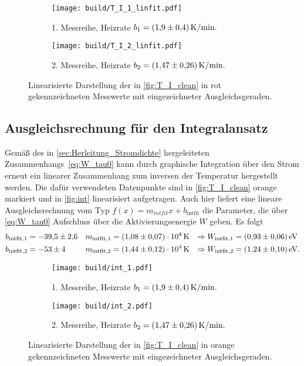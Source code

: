 \begin{figure}
    \centering
    \begin{subfigure}{\textwidth}
        \centering
        \texttt{[image: build/T\_I\_1\_linfit.pdf]}
        \caption{1. Messreihe, Heizrate $b_1 = \qty{1.9+-0.4}{\kelvin\per\minute}.$}
        \label{fig:T_I_1_Anstieg}
    \end{subfigure}
    \begin{subfigure}{\textwidth}
        \centering
        \texttt{[image: build/T\_I\_2\_linfit.pdf]}
        \caption{2. Messreihe, Heizrate $b_2 = \qty{1.47+-0.26}{\kelvin\per\minute}.$}
        \label{fig:T_I_2_Anstieg}
    \end{subfigure}
    \caption{Linearisierte Darstellung der in \autoref{fig:T_I_clean} in rot gekennzeichneten Messwerte mit eingezeichneter Ausgleichsgeraden.}
    \label{fig:T_I_Anstieg}
\end{figure}


\subsection{Ausgleichsrechnung für den Integralansatz}
\label{sec:Ausgleichsrechnung_Integralansatz}
Gemäß des in \autoref{sec:Herleitung_Stromdichte} hergeleiteten Zusammenhangs~\eqref{eq:W_tau0} kann durch graphische Integration über den Strom erneut ein linearer 
Zusammenhang zum inversen der Temperatur hergestellt werden. Die dafür verwendeten Datenpunkte sind in \autoref{fig:T_I_clean} orange markiert und in \autoref{fig:int}
linearisiert aufgetragen. Auch hier liefert eine lineare Ausgleichsrechnung vom Typ $f(x) = m_{intfit}x + b_{\text{intfit}}$ die Parameter, die über \autoref{eq:W_tau0} Aufschluss
über die Aktivierungsenergie $W$ geben. Es folgt
\begin{align*}
    b_{\text{intfit}, 1} &= \num{-39.5+-2.6} & m_{\text{intfit}, 1} &= \qty{1.08(0.07)e+04}{\kelvin} &\Rightarrow W_{\text{intfit}, 1} &= \qty{0.93+-0.06}{\electronvolt} \\
    b_{\text{intfit}, 2} &= \num{-53+-4}     & m_{\text{intfit}, 2} &= \qty{1.44(0.12)e+04}{\kelvin} &\Rightarrow W_{\text{intfit}, 2} &= \qty{1.24+-0.10}{\electronvolt}. \\
\end{align*}

\begin{figure}
    \centering
    \begin{subfigure}{\textwidth}
        \centering
        \texttt{[image: build/int\_1.pdf]}
        \caption{1. Messreihe, Heizrate $b_1 = \qty{1.9+-0.4}{\kelvin\per\minute}.$}
        \label{fig:int_1}
    \end{subfigure}
    \begin{subfigure}{\textwidth}
        \centering
        \texttt{[image: build/int\_2.pdf]}
        \caption{2. Messreihe, Heizrate $b_2 = \qty{1.47+-0.26}{\kelvin\per\minute}.$}
        \label{fig:int_2}
    \end{subfigure}
    \caption{Linearisierte Darstellung der in \autoref{fig:T_I_clean} in orange gekennzeichneten Messwerte mit eingezeichneter Ausgleichsgeraden.}
    \label{fig:int}
\end{figure}

